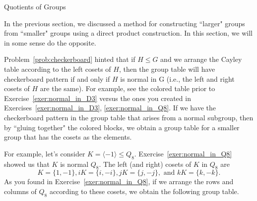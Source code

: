\begin{section}{Quotients of Groups}

In the previous section, we discussed a method for constructing ``larger" groups from ``smaller" groups using a direct product construction.  In this section, we will in some sense do the opposite.

Problem~\ref{prob:checkerboard} hinted that if $H\leq G$ and we arrange the Cayley table according to the left cosets of $H$, then the group table will have checkerboard pattern if and only if $H$ is normal in G (i.e., the left and right cosets of $H$ are the same).  For example, see the colored table prior to Exercise~\ref{exer:normal_in_D3} versus the ones you created in Exercises~\ref{exer:normal_in_D3}, \ref{exer:normal_in_Q8}.  If we have the checkerboard pattern in the group table that arises from a normal subgroup, then by ``gluing together" the colored blocks, we obtain a group table for a smaller group that has the cosets as the elements. 

For example, let's consider $K=\langle -1\rangle \leq Q_8$.  Exercise~\ref{exer:normal_in_Q8} showed us that $K$ is normal $Q_8$.  The left (and right) cosets of $K$ in $Q_8$ are
\[
K=\{1,-1\}, iK=\{i,-i\}, jK=\{j,-j\}, \text{ and } kK=\{k,-k\}.
\]
As you found in Exercise~\ref{exer:normal_in_Q8}, if we arrange the rows and columns of $Q_8$ according to these cosets, we obtain the following group table.


\end{section}
